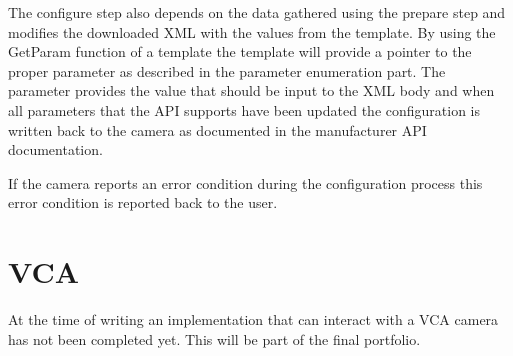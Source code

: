 The configure step also depends on the data gathered using the prepare step and modifies the downloaded XML with the values from the template.
By using the GetParam function of a template the template will provide a pointer to the proper parameter as described in the parameter enumeration part.
The parameter provides the value that should be input to the XML body and when all parameters that the API supports have been updated the configuration is written back to the camera as documented in the manufacturer API documentation.

If the camera reports an error condition during the configuration process this error condition is reported back to the user.

\section{VCA}
At the time of writing an implementation that can interact with a VCA camera has not been completed yet.
This will be part of the final portfolio.
